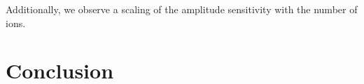 \documentclass[aps,prl,twocolumn,groupedaddress,floatfix]{revtex4-1}
\begin{document}
Additionally, we observe a scaling of the amplitude sensitivity with the number of ions.
\section{Conclusion}

\subsection{}
\subsubsection{}





%

\end{document}
